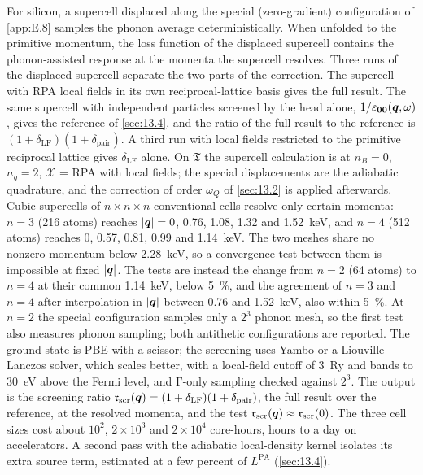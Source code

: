 For silicon, a supercell displaced along the special (zero-gradient) configuration of \cref{app:E.8} samples the phonon average deterministically. When unfolded to the primitive momentum, the loss function of the displaced supercell contains the phonon-assisted response at the momenta the supercell resolves. Three runs of the displaced supercell separate the two parts of the correction. The supercell with RPA local fields in its own reciprocal-lattice basis gives the full result. The same supercell with independent particles screened by the head alone, $1/\varepsilon_{\bm{0}\bm{0}}(\bm{q},\omega)$, gives the reference of \cref{sec:13.4}, and the ratio of the full result to the reference is $(1 + \delta_{\mathrm{LF}})(1 + \delta_{\mathrm{pair}})$. A third run with local fields restricted to the primitive reciprocal lattice gives $\delta_{\mathrm{LF}}$ alone. On $\mathfrak{T}$ the supercell calculation is at $n_B = 0$, $n_g = 2$, $\mathcal{X}$ = RPA with local fields; the special displacements are the adiabatic quadrature, and the correction of order $\omega_Q$ of \cref{sec:13.2} is applied afterwards. Cubic supercells of $n\times n\times n$ conventional cells resolve only certain momenta: $n = 3$ (216 atoms) reaches $|\bm{q}| = 0$, 0.76, 1.08, 1.32 and \SI{1.52}{keV}, and $n = 4$ (512 atoms) reaches 0, 0.57, 0.81, 0.99 and \SI{1.14}{keV}. The two meshes share no nonzero momentum below \SI{2.28}{keV}, so a convergence test between them is impossible at fixed $|\bm{q}|$. The tests are instead the change from $n = 2$ (64 atoms) to $n = 4$ at their common \SI{1.14}{keV}, below \SI{5}{\percent}, and the agreement of $n = 3$ and $n = 4$ after interpolation in $|\bm{q}|$ between 0.76 and \SI{1.52}{keV}, also within \SI{5}{\percent}. At $n = 2$ the special configuration samples only a $2^3$ phonon mesh, so the first test also measures phonon sampling; both antithetic configurations are reported. The ground state is PBE with a scissor; the screening uses Yambo or a Liouville--Lanczos solver, which scales better, with a local-field cutoff of \SI{3}{Ry} and bands to \SI{30}{eV} above the Fermi level, and $\mathrm{\Gamma}$-only sampling checked against $2^3$. The output is the screening ratio $\mathfrak{r}_{\mathrm{scr}}(\bm{q}) = (1 + \delta_{\mathrm{LF}})(1 + \delta_{\mathrm{pair}})$, the full result over the reference, at the resolved momenta, and the test $\mathfrak{r}_{\mathrm{scr}}(\bm{q}) \approx \mathfrak{r}_{\mathrm{scr}}(0)$. The three cell sizes cost about $10^2$, $2\times10^3$ and $2\times10^4$ core-hours, hours to a day on accelerators. A second pass with the adiabatic local-density kernel isolates its extra source term, estimated at a few percent of $L^{\mathrm{PA}}$ (\cref{sec:13.4}).


